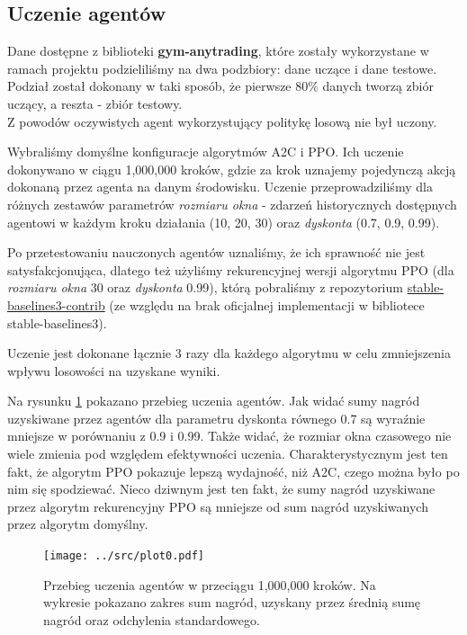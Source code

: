 \documentclass[12pt,a4paper]{article}
\begin{document}
\subsection{Uczenie agentów}

Dane dostępne z biblioteki \textbf{gym-anytrading}, które zostały wykorzystane
w ramach projektu podzieliliśmy na dwa podzbiory: dane uczące i dane testowe.
Podział został dokonany w taki sposób, że pierwsze $80\%$ danych tworzą
zbiór uczący, a reszta - zbiór testowy. \\

Z powodów oczywistych agent wykorzystujący politykę losową nie był uczony.
\smallskip

Wybraliśmy domyślne konfiguracje algorytmów A2C i PPO.
Ich uczenie dokonywano w ciągu 1,000,000 kroków,
gdzie za krok uznajemy pojedynczą akcją dokonaną przez
agenta na danym środowisku. Uczenie przeprowadziliśmy dla różnych zestawów
parametrów \emph{rozmiaru okna} - zdarzeń historycznych dostępnych agentowi
w każdym kroku działania (10, 20, 30) oraz \emph{dyskonta} (0.7, 0.9, 0.99).

Po przetestowaniu nauczonych agentów uznaliśmy, że ich sprawność nie
jest satysfakcjonująca, dlatego też użyliśmy rekurencyjnej wersji
algorytmu PPO (dla \emph{rozmiaru okna} 30 oraz \emph{dyskonta} 0.99), którą
pobraliśmy z repozytorium \href{https://github.com/Stable-Baselines-Team/stable-baselines3-contrib/pull/53}
{stable-baselines3-contrib} (ze względu na brak oficjalnej implementacji
w bibliotece stable-baselines3).

Uczenie jest dokonane łącznie 3 razy
dla każdego algorytmu w celu zmniejszenia wpływu
losowości na uzyskane wyniki.

Na rysunku \ref{fig:training} pokazano przebieg uczenia agentów.
Jak widać sumy nagród uzyskiwane przez agentów dla parametru dyskonta
równego 0.7 są wyraźnie mniejsze w porównaniu z 0.9 i 0.99. Także widać, że
rozmiar okna czasowego nie wiele zmienia pod względem efektywności uczenia.
Charakterystycznym jest ten fakt, że algorytm PPO pokazuje lepszą wydajność,
niż A2C, czego można było po nim się spodziewać. Nieco dziwnym jest ten
fakt, że sumy nagród uzyskiwane przez algorytm rekurencyjny PPO są mniejsze
od sum nagród uzyskiwanych przez algorytm domyślny.

\begin{figure}[!h]
  \centering
  \texttt{[image: ../src/plot0.pdf]}
  \caption{Przebieg uczenia agentów w przeciągu 1,000,000 kroków.
    Na wykresie pokazano zakres sum nagród, uzyskany przez
    średnią sumę nagród oraz odchylenia standardowego.}
  \label{fig:training}
\end{figure}
\end{document}
